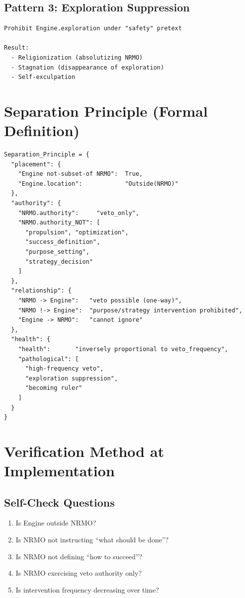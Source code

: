 \subsection{Pattern 3: Exploration Suppression}

\begin{lstlisting}[basicstyle=\ttfamily\small,frame=single]
Prohibit Engine.exploration under "safety" pretext

Result:
  - Religionization (absolutizing NRMO)
  - Stagnation (disappearance of exploration)
  - Self-exculpation
\end{lstlisting}

\section{Separation Principle (Formal Definition)}
\label{sec:sep-formal}

\begin{lstlisting}[basicstyle=\ttfamily\scriptsize,frame=single]
Separation_Principle = {
  "placement": {
    "Engine not-subset-of NRMO":  True,
    "Engine.location":            "Outside(NRMO)"
  },
  "authority": {
    "NRMO.authority":     "veto_only",
    "NRMO.authority_NOT": [
      "propulsion", "optimization",
      "success_definition",
      "purpose_setting",
      "strategy_decision"
    ]
  },
  "relationship": {
    "NRMO -> Engine":   "veto possible (one-way)",
    "NRMO !-> Engine":  "purpose/strategy intervention prohibited",
    "Engine -> NRMO":   "cannot ignore"
  },
  "health": {
    "health":       "inversely proportional to veto_frequency",
    "pathological": [
      "high-frequency veto",
      "exploration suppression",
      "becoming ruler"
    ]
  }
}
\end{lstlisting}

\section{Verification Method at Implementation}
\label{sec:sep-verification}

\subsection{Self-Check Questions}

\begin{enumerate}
\item Is Engine outside NRMO?
\item Is NRMO not instructing ``what should be done''?
\item Is NRMO not defining ``how to succeed''?
\item Is NRMO exercising veto authority only?
\item Is intervention frequency decreasing over time?
\end{enumerate}

